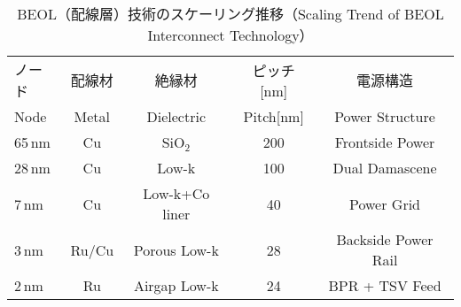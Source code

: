 \begin{table}[t]
  \centering
  \caption{BEOL（配線層）技術のスケーリング推移（Scaling Trend of BEOL Interconnect Technology）}
  \label{tab:beol_scaling}
  \footnotesize
  \setlength{\tabcolsep}{2pt}
  \renewcommand{\arraystretch}{1.1}
  \begin{tabular}{lcccc}
    \toprule
    ノード & 配線材 & 絶縁材 & ピッチ[nm] & 電源構造 \\
    Node & Metal & Dielectric & Pitch[nm] & Power Structure \\
    \midrule
    65\,nm & Cu & SiO$_2$ & 200 & Frontside Power \\
    28\,nm & Cu & Low-k & 100 & Dual Damascene \\
    7\,nm  & Cu & Low-k+Co liner & 40 & Power Grid \\
    3\,nm  & Ru/Cu & Porous Low-k & 28 & Backside Power Rail \\
    2\,nm  & Ru & Airgap Low-k & 24 & BPR + TSV Feed \\
    \bottomrule
  \end{tabular}
\end{table}
